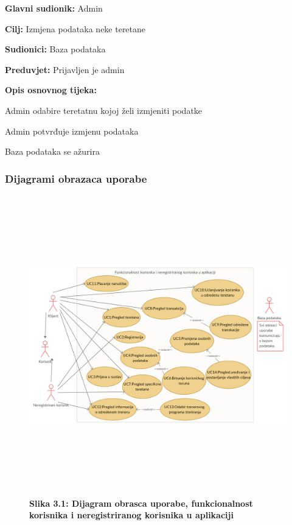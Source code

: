 					\noindent {}
					\begin{packed_item}
	
						\item \textbf{Glavni sudionik: } Admin
						\item  \textbf{Cilj:} Izmjena podataka neke teretane 
						\item  \textbf{Sudionici:} Baza podataka
						\item  \textbf{Preduvjet:} Prijavljen je admin
						\item  \textbf{Opis osnovnog tijeka:}
						
						\item[] \begin{packed_enum}
	
							\item Admin odabire teretatnu kojoj želi izmjeniti podatke
							\item Admin potvrđuje izmjenu podataka
							\item Baza podataka se ažurira
						\end{packed_enum}
					\end{packed_item}
				    \eject
		
               
			\subsubsection{Dijagrami obrazaca uporabe}
				\begin{figure}[!htb]
					\includegraphics[height= 13cm,width=1.2\textwidth]{slike/obrazac1.jpg}
					\textbf{Slika 3.1: Dijagram obrasca uporabe, funkcionalnost korisnika i neregistriranog korisnika u aplikaciji  }

				\end{figure}
				
